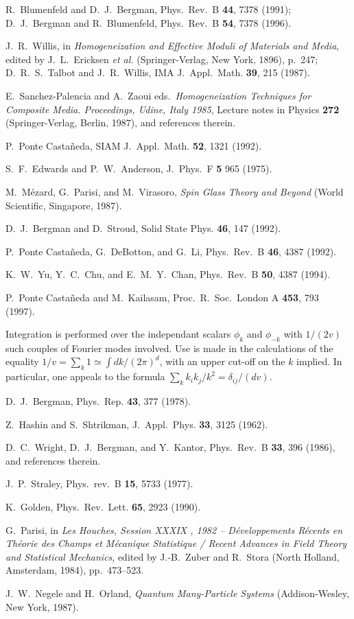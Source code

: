 \begin{references}
 R.~Blumenfeld and D.~J.~Bergman, Phys.\ Rev.\ B {\bf
44}, 7378 (1991); D.~J.~Bergman and R.~Blumenfeld, Phys.\ Rev.\ B {\bf
54}, 7378 (1996).

 J.~R.~Willis, in {\it Homogeneization and Effective Moduli 
of Materials and Media}, edited by J.~L.~Ericksen {\it et al.}
(Springer-Verlag, New York, 1896), p.\ 247; D.~R.~S.~Talbot and J.~R.~Willis,
IMA J.\ Appl.\ Math. {\bf 39}, 215 (1987).

 E.\ Sanchez-Palencia and A.\ Zaoui eds.\,
{\em Homogeneization Techniques for Composite Media. Proceedings, Udine, 
Italy 1985}, Lecture notes in Physics {\bf 272} (Springer-Verlag, Berlin,
1987), and references therein.

 P.~Ponte Casta\~{n}eda, SIAM J.\ Appl.\ Math. {\bf
52}, 1321 (1992).

 S.~F.~Edwards and P.~W.~Anderson, J.\ Phys.\ F {\bf
5} 965 (1975).

 M.~M\'{e}zard, G.~Parisi, and M.~Virasoro, {\it
Spin Glass Theory and Beyond} (World Scientific, Singapore, 1987).

 D.~J.~Bergman and D.~Stroud, Solid State Phys. {\bf
46}, 147 (1992).

 P.~Ponte Casta\~{n}eda, G.~DeBotton, and G.~Li, Phys.\ Rev.\ B {\bf 46}, 4387 (1992).

 K.~W.~Yu, Y.~C.~Chu, and E.~M.~Y.~Chan, Phys.\ Rev.\ B
{\bf 50}, 4387 (1994).

 P.~Ponte Casta\~{n}eda and M.\ Kailasam, Proc.\ R.\ Soc.\ London A {\bf 453}, 793 (1997).

 Integration is performed over the independant scalars
$\phi_k$ and $\phi_{-k}$ with $1/(2v)$ such couples of Fourier modes
involved. Use is made in the calculations of the
equality $1/v=\sum_k 1\simeq\int dk /(2\pi)^d$, with an
upper cut-off on the $k$ implied. In particular, one appeals
to the formula $\sum_k k_i k_j/k^2=\delta_{ij}/(dv)$.

 D.~J.~Bergman, Phys.\ Rep. {\bf 43}, 377 (1978).

 Z.~Hashin and S.~Shtrikman, J.\ Appl.\ Phys.
{\bf 33}, 3125 (1962).

 D.\ C.\ Wright, D.\ J.\ Bergman, and Y.\ Kantor,
Phys.\ Rev.\ B {\bf 33}, 396 (1986), and references therein.

 J.\ P.\ Straley, Phys.\ rev.\ B {\bf 15}, 5733
(1977).

 K.\ Golden, Phys.\ Rev.\ Lett. {\bf 65}, 2923 (1990).

 G.~Parisi, in {\it Les Houches, Session XXXIX , 1982 -- 
D\'{e}veloppements R\'{e}cents en Th\'{e}orie des Champs et M\'{e}canique 
Statistique / Recent Advances in Field Theory and Statistical Mechanics},
edited by J.-B.\ Zuber and R.~Stora (North Holland, Amsterdam, 1984),
pp.\ 473--523.

 J.~W.~Negele and H.~Orland,
{\it Quantum Many-Particle Systems} (Addison-Wesley, New York, 1987).
\end{references}

